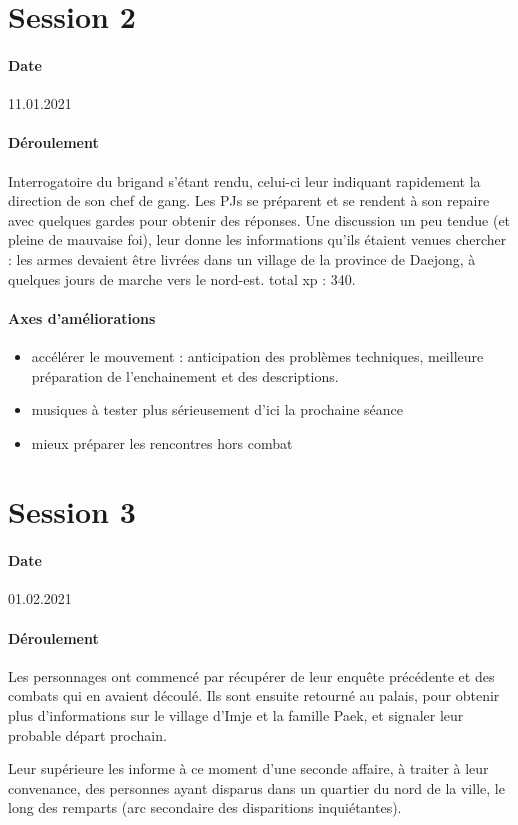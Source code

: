 \documentclass[10pt,a4paper]{book}
\begin{document}
\section{Session 2}
\paragraph{Date}11.01.2021
\paragraph{Déroulement}
Interrogatoire du brigand s'étant rendu, celui-ci leur indiquant rapidement la direction de son chef de gang. Les PJs se préparent et se rendent à son repaire avec quelques gardes pour obtenir des réponses. Une discussion un peu tendue (et pleine de mauvaise foi), leur donne les informations qu'ils étaient venues chercher : les armes devaient être livrées dans un village de la province de Daejong, à quelques jours de marche vers le nord-est. total xp : 340.
\paragraph{Axes d'améliorations}
\begin{itemize}
\item accélérer le mouvement : anticipation des problèmes techniques, meilleure préparation de l'enchainement et des descriptions.
\item musiques à tester plus sérieusement d'ici la prochaine séance
\item mieux préparer les rencontres hors combat
\end{itemize}

\section{Session 3}
\paragraph{Date}01.02.2021
\paragraph{Déroulement}
Les personnages ont commencé par récupérer de leur enquête précédente et des combats qui en avaient découlé. Ils sont ensuite retourné au palais, pour obtenir plus d'informations sur le village d'Imje et la famille Paek, et signaler leur probable départ prochain.

Leur supérieure les informe à ce moment d'une seconde affaire, à traiter à leur convenance, des personnes ayant disparus dans un quartier du nord de la ville, le long des remparts (arc secondaire des disparitions inquiétantes).
\end{document}
